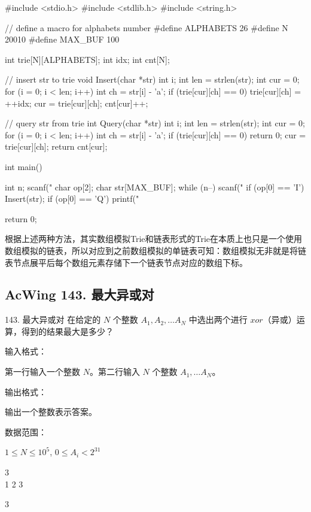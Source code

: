 \begin{mycpptwocol}[数组模拟Trie]
    #include <stdio.h>
    #include <stdlib.h>
    #include <string.h>

    // define a macro for alphabets number
    #define ALPHABETS 26
    #define N 20010
    #define MAX_BUF 100

    int trie[N][ALPHABETS];
    int idx;
    int cnt[N];

    // insert str to trie
    void Insert(char *str) {
        int i;
        int len = strlen(str);
        int cur = 0;
        for (i = 0; i < len; i++) {
            int ch = str[i] - 'a';
            if (trie[cur][ch] == 0) {
                trie[cur][ch] = ++idx;
            }
            cur = trie[cur][ch];
        }
        cnt[cur]++;
    }

    // query str from trie
    int Query(char *str) {
        int i;
        int len = strlen(str);
        int cur = 0;
        for (i = 0; i < len; i++) {
            int ch = str[i] - 'a';
            if (trie[cur][ch] == 0) {
                return 0;
            }
            cur = trie[cur][ch];
        }
        return cnt[cur];
    }

    int main() {
        int n;
        scanf("%
        char op[2];
        char str[MAX_BUF];
        while (n--) {
            scanf("%
            if (op[0] == 'I') {
                Insert(str);
            }
            if (op[0] == 'Q') {
                printf("%
            }
        }

        return 0;
    }
\end{mycpptwocol}

\begin{information}
    根据上述两种方法，其实数组模拟Trie和链表形式的Trie在本质上也只是一个使用数组模拟的链表，所以对应到之前数组模拟的单链表可知：数组模拟无非就是将链表节点展平后每个数组元素存储下一个链表节点对应的数组下标。
\end{information}

\subsection{AcWing 143. 最大异或对}

\begin{titledbox}{143. 最大异或对}
    在给定的 $N$ 个整数 $A_1, A_2, \dots A_N$ 中选出两个进行 $xor$（异或）运算，得到的结果最大是多少？

    输入格式：

    第一行输入一个整数 $N$。第二行输入 $N$ 个整数 $A_1, \dots A_N$。

    输出格式：

    输出一个整数表示答案。

    数据范围：

    $1 \le N \le 10^5$, $0 \le A_i < 2^{31}$

    \begin{inputblock}
        3 \\
        1 2 3
    \end{inputblock}
    \begin{outputblock}
        3
    \end{outputblock}
\end{titledbox}

